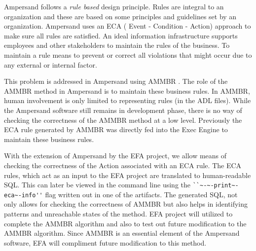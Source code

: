 %

Ampersand follows a \emph{rule based} design principle. Rules are integral to an organization
and these are based on some principles and guidelines set by an organization.
Ampersand uses an ECA ( Event - Condition - Action) approach to make sure all rules are satisfied. An ideal information infrastructure supports employees and other stakeholders to maintain the rules of the business. To maintain a rule means to prevent or correct all violations that might occur due to any external or internal factor.
 
 This problem is addressed in Ampersand using AMMBR \citep{Ampersand}. The role of the AMMBR method in Ampersand is to maintain these business rules. In AMMBR, human involvement is only limited to representing rules (in the ADL files). While the Ampersand software still remains in development phase, there is no way of checking the correctness of the AMMBR method at a low level. Previously the ECA rule generated by AMMBR was directly fed into the Exec Engine to maintain these business rules. 
 
With the extension of Ampersand by the EFA project, we allow means of checking the correctness of the Action associated with an ECA rule. The ECA rules, which act as an input to the EFA project are translated to human-readable SQL. This can later be viewed in the command line using the \verb|``~-~-print~-eca~-info''| flag written out in one of the artifacts. The generated SQL, not only allows for checking the correctness of AMMBR but also helps in identifying 
patterns and unreachable states of the method. EFA project will utilized to complete the AMMBR algorithm and also to test out future modification to the AMMBR algorithm. Since AMMBR is an essential element of the Ampersand software, EFA will compliment future modification to this method.
 

%